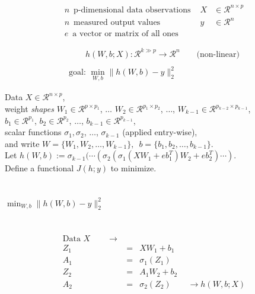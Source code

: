 \documentclass[12pt]{article}
\begin{document}
\begin{eqnarray*}
n\,\,\, \mbox{p-dimensional data observations } &X& \in \mathcal{R}^{n \times p} \\
n\,\,\,\mbox{measured output values } &y& \in \mathcal{R}^{n} \\
e\,\,\, \mbox{a vector or matrix of all ones}
\end{eqnarray*}

\begin{eqnarray*}
\qquad h(W,b; X):\mathcal{R}^{k \gg p}\rightarrow\mathcal{R}^n\qquad\mbox{(non-linear)}\\
\\
\mbox{goal: }  \min_{W, b}\|h(W, b) - y\|_2^2\qquad\mbox{ }
\end{eqnarray*}

\noindent
Data  $X\in\mathcal{R}^{n\times p}$,\\
weight \emph{shapes} $W_1 \in \mathcal{R}^{p \times p_1}$, $\ldots$
$W_2\in\mathcal{R}^{p_1 \times p_2}$, $\ldots$,
$W_{k-1}\in\mathcal{R}^{p_{k-2} \times p_{k-1}}$,\\
$b_1\in\mathcal{R}^{p_1}$, $b_2\in\mathcal{R}^{p_2}$,
$\ldots$, $b_{k-1}\in\mathcal{R}^{p_{k-1}}$,\\
scalar functions $\sigma_1, \sigma_2$, $\ldots$, $\sigma_{k-1}$ (applied entry-wise),\\
and write   $W=\{W_1, W_2, \ldots,W_{k-1}\}, \,\,\, b=\{b_1, b_2, \ldots, b_{k-1}\}$.\\

\noindent
Let $h(W,b) := \sigma_{k-1}(\cdots(\sigma_2( \sigma_1(X W_1 + eb_1^T)W_2 + eb_2^T)\cdots)$.\\

\noindent
Define a functional $J(h; y)$ to minimize.
\\
\\
\\

$\min_{W,b}\|h(W,b)-y\|_2^2$
\\
\\
\\

\begin{eqnarray*}
\mbox{Data } X \qquad\rightarrow\\
Z_1 &=& XW_1 + b_1\\
A_1 &=& \sigma_1(Z_1) \\
Z_2 &=& A_1 W_2 + b_2\\
A_2 &=& \sigma_2(Z_2) \qquad \rightarrow h(W, b; X)
\end{eqnarray*}
\end{document}

